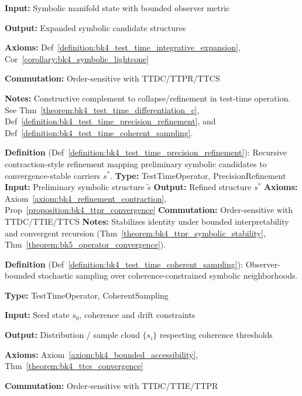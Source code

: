\begin{description}[leftmargin=2.5cm, style=nextline]
\textbf{Input:} Symbolic manifold state with bounded observer metric

\textbf{Output:} Expanded symbolic candidate structures

\textbf{Axioms:} Def~\ref{definition:bk4_test_time_integrative_expansion}, Cor~\ref{corollary:bk4_symbolic_lightcone}

\textbf{Commutation:} Order-sensitive with TTDC/TTPR/TTCS

\textbf{Notes:} Constructive complement to collapse/refinement in test-time
operation. See Thm~\ref{theorem:bk4_test_time_differentiation_c},
Def~\ref{definition:bk4_test_time_precision_refinement}, and
Def~\ref{definition:bk4_test_time_coherent_sampling}.

\item[\textbf{Test-Time Precision Refinement} \hfill \ensuremath{\mathrm{TTPR}}] 
\label{dict:appA_test_time_precision_refinement}
\textbf{Definition} (Def~\ref{definition:bk4_test_time_precision_refinement}): Recursive contraction-style refinement mapping preliminary symbolic candidates to convergence-stable carriers \( s^* \).
\textbf{Type:} TestTimeOperator, PrecisionRefinement
\textbf{Input:} Preliminary symbolic structure \( \tilde{s} \)
\textbf{Output:} Refined structure \( s^* \)
\textbf{Axioms:} Axiom~\ref{axiom:bk4_refinement_contraction}, Prop~\ref{proposition:bk4_ttpr_convergence}
\textbf{Commutation:} Order-sensitive with TTDC/TTIE/TTCS
\textbf{Notes:} Stabilizes identity under bounded interpretability and convergent recursion (Thm~\ref{theorem:bk4_ttpr_symbolic_stability}, Thm~\ref{theorem:bk5_operator_convergence}).

\item[\textbf{Test-Time Coherent Sampling} \hfill \ensuremath{\mathrm{TTCS}}] 
\label{dict:appA_test_time_coherent_sampling}
\textbf{Definition} (Def~\ref{definition:bk4_test_time_coherent_sampling}):
Observer-bounded stochastic sampling over coherence-constrained symbolic
neighborhoods.

\textbf{Type:} TestTimeOperator, CoherentSampling

\textbf{Input:} Seed state \( s_0 \), coherence and drift constraints

\textbf{Output:} Distribution / sample cloud \( \{s_i\} \) respecting coherence thresholds

\textbf{Axioms:} Axiom~\ref{axiom:bk4_bounded_accessibility}, Thm~\ref{theorem:bk4_ttcs_convergence}

\textbf{Commutation:} Order-sensitive with TTDC/TTIE/TTPR


\end{description}
